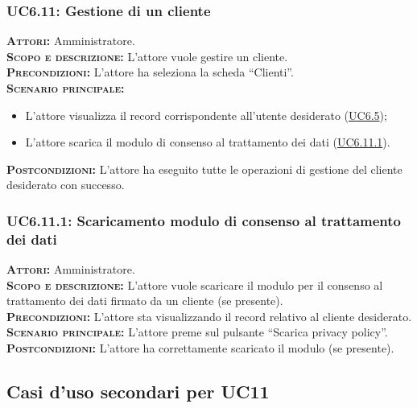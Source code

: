 \subsubsection{UC6.11: Gestione di un cliente}
\label{sec:UC611}
\textsc{\textbf{Attori:}} Amministratore.\\
\textsc{\textbf{Scopo e descrizione:}} L'attore vuole gestire un cliente.\\
\textsc{\textsc{\textbf{Precondizioni:}}} L'attore ha seleziona la scheda ``Clienti''.\\
\textsc{\textbf{Scenario principale:}} 
\begin{itemize}
    \item L'attore visualizza il record corrispondente all'utente desiderato (\hyperref[sec:UC65]{UC6.5});
    \item L'attore scarica il modulo di consenso al trattamento dei dati (\hyperref[sec:UC6101]{UC6.11.1}).
\end{itemize}
\textsc{\textbf{Postcondizioni:}} L'attore ha eseguito tutte le operazioni di gestione del cliente desiderato con successo.

\subsubsection{UC6.11.1: Scaricamento modulo di consenso al trattamento dei dati}
\label{sec:UC6111}
\textsc{\textbf{Attori:}} Amministratore.\\
\textsc{\textbf{Scopo e descrizione:}} L'attore vuole scaricare il modulo per il consenso al trattamento dei dati firmato da un cliente (se presente).\\
\textsc{\textsc{\textbf{Precondizioni:}}} L'attore sta visualizzando il record relativo al cliente desiderato.\\
\textsc{\textbf{Scenario principale:}} L'attore preme sul pulsante ``Scarica privacy policy''.\\
\textsc{\textbf{Postcondizioni:}} L'attore ha correttamente scaricato il modulo (se presente).

\subsection{Casi d'uso secondari per UC11}
